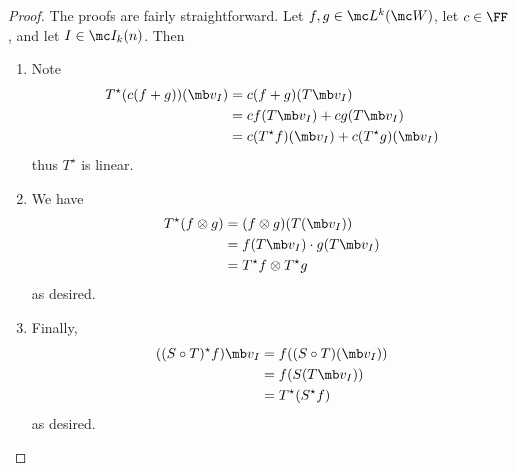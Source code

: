 \documentclass{fkbook}
\theoremstyle{snazzydefinition}
\begin{document}
\begin{proof}
  The proofs are fairly straightforward. Let $f,g \in \mc L^k(\mc W)$,
  let $c \in \FF$, and let $I \in \mc I_k(n)$. Then
  \begin{enumerate}[label=(\arabic*)]
    \item Note
      \begin{align*}
        T^\star(c(f+g)) (\mb v_I)
        &= c(f + g) (T \mb v_I) \\
        &= cf(T \mb v_I) + cg(T \mb v_I) \\
        &= c(T^\star f)(\mb v_I) + c(T^\star g)(\mb v_I)
      \end{align*}
      thus $T^\star$ is linear.
    \item We have
      \begin{align*}
        T^\star(f \otimes g)
        &= (f \otimes g)(T(\mb v_I)) \\
        &= f(T \mb v_I) \cdot g(T \mb v_I) \\
        &= T^\star f \otimes T^\star g
      \end{align*}
      as desired.
    \item Finally,
      \begin{align*}
        ((S \circ T)^\star f )\mb v_I
        &= f((S \circ T)(\mb v_I)) \\
        &= f(S(T \mb v_I)) \\
        &= T^\star (S^\star f)
      \end{align*}
      as desired.
  \end{enumerate}
\end{proof}
\end{document}
